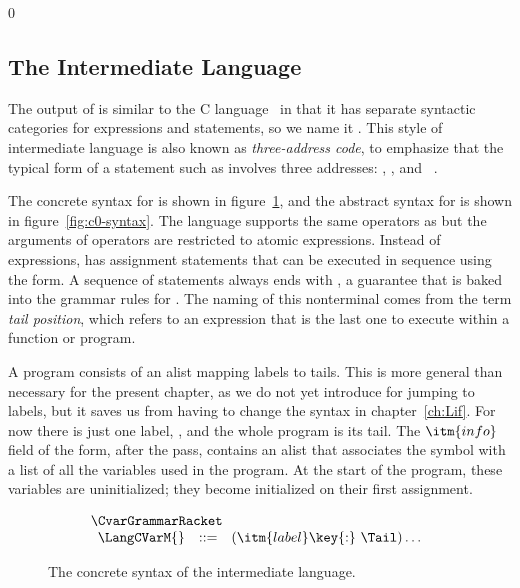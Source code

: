 \documentclass[7x10]{TimesAPriori_MIT}%
\def\racketEd{0}
\def\edition{1}
\numberwithin{theorem}{chapter}
\numberwithin{definition}{chapter}
\numberwithin{equation}{chapter}
\begin{document}
{\if\edition\racketEd  
\subsection{The \LangCVar{} Intermediate Language}

The output of  is similar to the C
language~\citep{Kernighan:1988nx} in that it has separate syntactic
categories for expressions and statements, so we name it \LangCVar{}.
This style of intermediate language is also known as
\emph{three-address code}, to emphasize that the typical form of a
statement such as  involves three
addresses: , , and ~\citep{Aho:2006wb}.

The concrete syntax for \LangCVar{} is shown in
figure~\ref{fig:c0-concrete-syntax}, and the abstract syntax for
\LangCVar{} is shown in figure~\ref{fig:c0-syntax}.
%
The \LangCVar{} language supports the same operators as \LangVar{} but
the arguments of operators are restricted to atomic
expressions. Instead of  expressions, \LangCVar{} has
assignment statements that can be executed in sequence using the
 form. A sequence of statements always ends with
, a guarantee that is baked into the grammar rules for
. The naming of this nonterminal comes from the term
\emph{tail position}, which refers to an
expression that is the last one to execute within a function or
program.

A \LangCVar{} program consists of an alist mapping labels to
tails. This is more general than necessary for the present chapter, as
we do not yet introduce  for jumping to labels, but it saves
us from having to change the syntax in chapter~\ref{ch:Lif}.  For now
there is just one label, , and the whole program is
its tail.
%
The $\itm{info}$ field of the  form, after the
 pass, contains an alist that associates the
symbol  with a list of all the variables used in the
program. At the start of the program, these variables are
uninitialized; they become initialized on their first assignment.

\begin{figure}[tbp]
\begin{tcolorbox}[colback=white]
\[
\begin{array}{l}
  \CvarGrammarRacket \\
\begin{array}{lcl}
\LangCVarM{} & ::= & (\itm{label}\key{:}~ \Tail)\ldots
\end{array}
\end{array}
\]
\end{tcolorbox}
\caption{The concrete syntax of the \LangCVar{} intermediate language.}
\label{fig:c0-concrete-syntax}
\end{figure}


}
\end{document}
